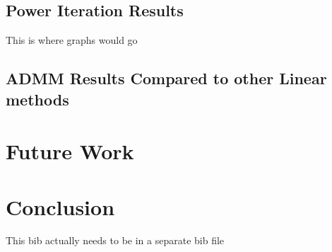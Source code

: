 \documentclass[letterpaper,12pt,onecolumn]{article}
\begin{document}
\subsection{Power Iteration Results}
This is where graphs would go 


\subsection{ADMM Results Compared to other Linear methods}


\section{Future Work}


\section{Conclusion}

This bib actually needs to be in a separate bib file
\vfill\pagebreak








 
 





\end{document}
